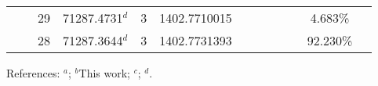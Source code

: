 \begin{table*}
\begin{center}
{\begin{tabular}{:l;l;c;l;c;l;c;l;l;c;c;c;c}
\rowstyle{\itshape}               &        & 29        & 71287.4731$^{d}$                 & 3 &  1402.7710015      &      & $                                        $ & $                                        $ & $      $ &              & 4.683\%   & $     ^{}     $\\
\rowstyle{\itshape}               &        & 28        & 71287.3644$^{d}$                 & 3 &  1402.7731393      &      & $                                        $ & $                                        $ & $      $ &              & 92.230\%  & $     ^{}     $\\
\hline
\end{tabular}
}
{\footnotesize References:
$^{a}$\citet{Griesmann:2000:L113};
$^{b}$This work;
$^{c}$\citet{Dzuba:2007:062510};
$^{d}$\citet{Berengut:2003:022502}.}
\end{center}
\end{table*}
